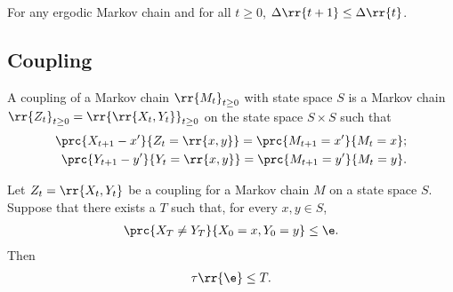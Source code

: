 \documentclass{article}
\begin{document}
\begin{lemma}
  For any ergodic Markov chain and for all $t\geq 0$, $\Delta\rr{t+1}\leq\Delta\rr{t}$.
\end{lemma}

\subsection{Coupling}

\begin{definition}
  A coupling of a Markov chain $\rr{M_t}_{t\geq 0}$ with state space $S$ is a Markov
  chain $\rr{Z_t}_{t\geq 0}=\rr{\rr{X_t,Y_t}}_{t\geq 0}$ on the state space $S\times S$
  such that
  \begin{align*}
    \prc{X_{t+1}-x'}{Z_t=\rr{x,y}} = \prc{M_{t+1}=x'}{M_t=x}; \\
    \prc{Y_{t+1}-y'}{Y_t=\rr{x,y}} = \prc{M_{t+1}=y'}{M_t=y}.
  \end{align*}
\end{definition}

\begin{lemma}
  Let $Z_t=\rr{X_t,Y_t}$ be a coupling for a Markov chain $M$ on a state space $S$.
  Suppose that there exists a $T$ such that, for every $x,y\in S$,
  \begin{align*}
    \prc{X_T\neq Y_T}{X_0=x,Y_0=y}\leq \e.
  \end{align*}
  Then
  \begin{align*}
    \tau\rr{\e}\leq T.
  \end{align*}
\end{lemma}
\end{document}
